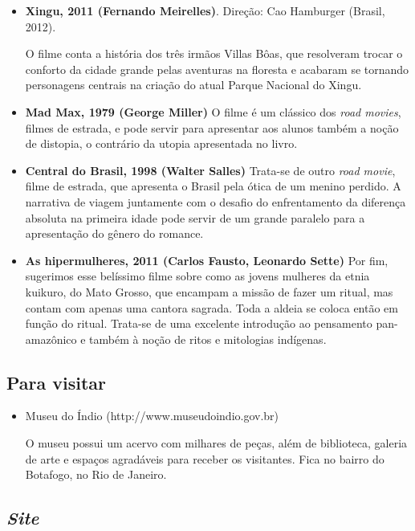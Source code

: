 \documentclass[12pt]{extarticle}
\begin{document}
\begin{itemize}
\item\textbf{Xingu, 2011 (Fernando Meirelles)}. Direção: Cao Hamburger (Brasil, 2012).

O filme conta a história dos três irmãos Villas Bôas, que resolveram
trocar o conforto da cidade grande pelas aventuras na floresta e
acabaram se tornando personagens centrais na criação do atual Parque
Nacional do Xingu.

\item\textbf{Mad Max, 1979 (George Miller)}
O filme é um clássico dos \textit{road movies}, filmes de estrada, e pode servir para 
apresentar aos alunos também a noção de distopia, o contrário da utopia apresentada no livro. 

\item\textbf{Central do Brasil, 1998 (Walter Salles)}
Trata-se de outro \textit{road movie}, filme de estrada, que apresenta
o Brasil pela ótica de um menino perdido. A narrativa de viagem juntamente com o desafio 
do enfrentamento da diferença absoluta na primeira idade pode servir 
de um grande paralelo para a apresentação do gênero do romance. 

\item\textbf{As hipermulheres, 2011 (Carlos Fausto, Leonardo Sette)}
Por fim, sugerimos esse belíssimo filme sobre como as jovens mulheres da etnia 
kuikuro, do Mato Grosso, que encampam a missão de fazer um ritual, mas contam 
com apenas uma cantora sagrada. Toda a aldeia se coloca então em função do 
ritual. Trata-se de uma excelente introdução ao pensamento pan-amazônico e
também à noção de ritos e mitologias indígenas. 
\end{itemize}


\subsection{Para visitar}

\begin{itemize}
\item Museu do Índio (http://www.museudoindio.gov.br)

O museu possui um acervo com milhares de peças, além de biblioteca,
galeria de arte e espaços agradáveis para receber os visitantes. Fica no
bairro do Botafogo, no Rio de Janeiro.
\end{itemize}

\subsection{\emph{Site}}
\end{document}
